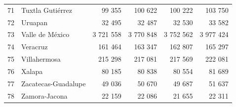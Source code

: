 \documentclass[]{article}
\begin{document}
\begin{table}[H]
\begin{tabular}{rlrrrr}
  71 & Tuxtla Gutiérrez & 99 355 & 100 622 & 100 222 & 103 750 \\ 
  72 & Uruapan & 32 495 & 32 487 & 32 530 & 33 582 \\ 
  73 & Valle de México & 3 721 558 & 3 770 848 & 3 752 562 & 3 977 424 \\ 
  74 & Veracruz & 161 464 & 163 347 & 162 807 & 165 297 \\ 
  75 & Villahermosa & 215 298 & 217 081 & 217 569 & 222 081 \\ 
  76 & Xalapa & 80 185 & 80 838 & 80 554 & 81 689 \\ 
  77 & Zacatecas-Guadalupe & 49 036 & 50 670 & 49 687 & 51 637 \\ 
  78 & Zamora-Jacona & 22 159 & 22 086 & 21 655 & 22 311 \\ 
   \hline
\end{tabular}
\endgroup
\end{table}
\end{document}
